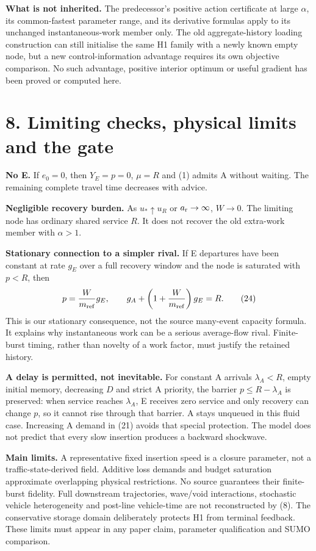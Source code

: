 \documentclass[11pt,a4paper]{article}
\begin{document}
\textbf{What is not inherited.} The predecessor's positive action certificate
at large $\alpha$, its common-fastest parameter range, and its derivative
formulas apply to its unchanged instantaneous-work member only. The old
aggregate-history loading construction can still initialise the same H1
family with a newly known empty node, but a new control-information advantage
requires its own objective comparison. No such advantage, positive interior
optimum or useful gradient has been proved or computed here.

\newpage
\section*{8. Limiting checks, physical limits and the gate}

\textbf{No E.} If $e_0=0$, then $Y_E=p=0$, $\mu=R$ and (1) admits A
without waiting. The remaining complete travel time decreases with advice.

\textbf{Negligible recovery burden.} As $u_*\uparrow u_R$ or
$a_{\rm r}\to\infty$, $W\to0$. The limiting node has ordinary shared
service $R$. It does not recover the old extra-work member with $\alpha>1$.

\textbf{Stationary connection to a simpler rival.} If E departures have
been constant at rate $g_E$ over a full recovery window and the node is
saturated with $p<R$, then
\begin{equation}
 p=\frac{W}{m_{\rm ref}}g_E,\qquad
 g_A+\left(1+\frac{W}{m_{\rm ref}}\right)g_E=R.
 \tag{24}
\end{equation}
This is our stationary consequence, not the source many-event capacity
formula. It explains why instantaneous work can be a serious average-flow
rival. Finite-burst timing, rather than novelty of a work factor, must
justify the retained history.

\textbf{A delay is permitted, not inevitable.} For constant A arrivals
$\lambda_A<R$, empty initial memory, decreasing $D$ and strict A priority,
the barrier $p\leq R-\lambda_A$ is preserved: when service reaches
$\lambda_A$, E receives zero service and only recovery can change $p$,
so it cannot rise through that barrier. A stays unqueued in this fluid
case. Increasing A demand in (21) avoids that special protection. The model
does not predict that every slow insertion produces a backward shockwave.

\textbf{Main limits.} A representative fixed insertion speed is a closure
parameter, not a traffic-state-derived field. Additive loss demands and
budget saturation approximate overlapping physical restrictions. No source
guarantees their finite-burst fidelity. Full downstream trajectories,
wave/void interactions, stochastic vehicle heterogeneity and post-line
vehicle-time are not reconstructed by (8). The conservative storage domain
deliberately protects H1 from terminal feedback. These limits must appear
in any paper claim, parameter qualification and SUMO comparison.
\end{document}
